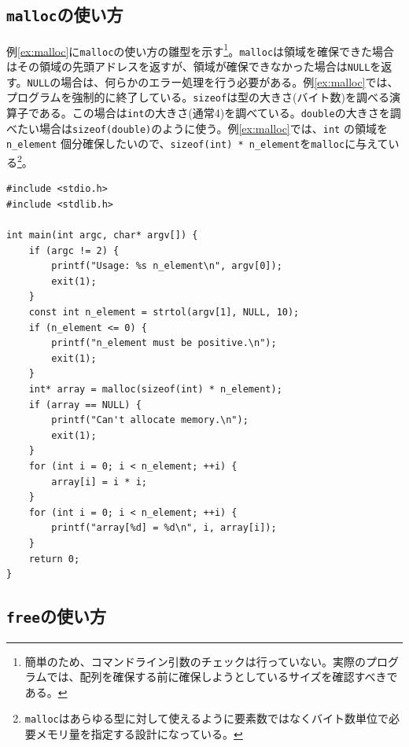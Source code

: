 \subsection{\texttt{malloc}の使い方}

例\ref{ex:malloc}に\texttt{malloc}の使い方の雛型を示す\footnote{簡単のため、コマンドライン引数のチェックは行っていない。実際のプログラムでは、配列を確保する前に確保しようとしているサイズを確認すべきである。}。\texttt{malloc}は領域を確保できた場合はその領域の先頭アドレスを返すが、領域が確保できなかった場合は\texttt{NULL}を返す。\texttt{NULL}の場合は、何らかのエラー処理を行う必要がある。例\ref{ex:malloc}では、プログラムを強制的に終了している。\texttt{sizeof}は型の大きさ(バイト数)を調べる演算子である。この場合は\texttt{int}の大きさ(通常4)を調べている。\texttt{double}の大きさを調べたい場合は\texttt{sizeof(double)}のように使う。例\ref{ex:malloc}では、\texttt{int} の領域を \texttt{n\_element} 個分確保したいので、\texttt{sizeof(int) * n\_element}を\texttt{malloc}に与えている\footnote{\texttt{malloc}はあらゆる型に対して使えるように要素数ではなくバイト数単位で必要メモリ量を指定する設計になっている。}。
\begin{reidai}\label{ex:malloc}
    \begin{verbatim}
#include <stdio.h>
#include <stdlib.h>

int main(int argc, char* argv[]) {
    if (argc != 2) {
        printf("Usage: %s n_element\n", argv[0]);
        exit(1);
    }
    const int n_element = strtol(argv[1], NULL, 10);
    if (n_element <= 0) {
        printf("n_element must be positive.\n");
        exit(1);
    }
    int* array = malloc(sizeof(int) * n_element);
    if (array == NULL) {
        printf("Can't allocate memory.\n");
        exit(1);
    }
    for (int i = 0; i < n_element; ++i) {
        array[i] = i * i;
    }
    for (int i = 0; i < n_element; ++i) {
        printf("array[%d] = %d\n", i, array[i]);
    }
    return 0;
}
\end{verbatim}
\end{reidai} \noindent

\subsection{\texttt{free}の使い方}

